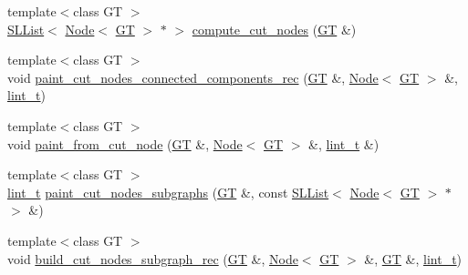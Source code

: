 \begin{DoxyCompactItemize}
\item 
{\footnotesize template$<$class GT $>$ }\\\hyperlink{class_designar_1_1_s_l_list}{S\+L\+List}$<$ \hyperlink{namespace_designar_a5af326c65aa2bd26b26c410f2030d09e}{Node}$<$ \hyperlink{demo-buildgraph_8_c_a3001c40d2c31ca87ed96cd7d1334a55e}{GT} $>$ $\ast$ $>$ \hyperlink{namespace_designar_a8e4bd28af32addb6683407d7e898de7b}{compute\+\_\+cut\+\_\+nodes} (\hyperlink{demo-buildgraph_8_c_a3001c40d2c31ca87ed96cd7d1334a55e}{GT} \&)
\item 
{\footnotesize template$<$class GT $>$ }\\void \hyperlink{namespace_designar_aba19bd6f648fd502d1dcbcc37d1edfda}{paint\+\_\+cut\+\_\+nodes\+\_\+connected\+\_\+components\+\_\+rec} (\hyperlink{demo-buildgraph_8_c_a3001c40d2c31ca87ed96cd7d1334a55e}{GT} \&, \hyperlink{namespace_designar_a5af326c65aa2bd26b26c410f2030d09e}{Node}$<$ \hyperlink{demo-buildgraph_8_c_a3001c40d2c31ca87ed96cd7d1334a55e}{GT} $>$ \&, \hyperlink{namespace_designar_a9d113d66a39e82b73727c72cd3a52f73}{lint\+\_\+t})
\item 
{\footnotesize template$<$class GT $>$ }\\void \hyperlink{namespace_designar_a0b57b399593e711bef1c99a4c41c238a}{paint\+\_\+from\+\_\+cut\+\_\+node} (\hyperlink{demo-buildgraph_8_c_a3001c40d2c31ca87ed96cd7d1334a55e}{GT} \&, \hyperlink{namespace_designar_a5af326c65aa2bd26b26c410f2030d09e}{Node}$<$ \hyperlink{demo-buildgraph_8_c_a3001c40d2c31ca87ed96cd7d1334a55e}{GT} $>$ \&, \hyperlink{namespace_designar_a9d113d66a39e82b73727c72cd3a52f73}{lint\+\_\+t} \&)
\item 
{\footnotesize template$<$class GT $>$ }\\\hyperlink{namespace_designar_a9d113d66a39e82b73727c72cd3a52f73}{lint\+\_\+t} \hyperlink{namespace_designar_a4a53202e6320a9435f829867671c26c1}{paint\+\_\+cut\+\_\+nodes\+\_\+subgraphs} (\hyperlink{demo-buildgraph_8_c_a3001c40d2c31ca87ed96cd7d1334a55e}{GT} \&, const \hyperlink{class_designar_1_1_s_l_list}{S\+L\+List}$<$ \hyperlink{namespace_designar_a5af326c65aa2bd26b26c410f2030d09e}{Node}$<$ \hyperlink{demo-buildgraph_8_c_a3001c40d2c31ca87ed96cd7d1334a55e}{GT} $>$ $\ast$$>$ \&)
\item 
{\footnotesize template$<$class GT $>$ }\\void \hyperlink{namespace_designar_aecd027238b87a5b24792ea3ccd0c44b1}{build\+\_\+cut\+\_\+nodes\+\_\+subgraph\+\_\+rec} (\hyperlink{demo-buildgraph_8_c_a3001c40d2c31ca87ed96cd7d1334a55e}{GT} \&, \hyperlink{namespace_designar_a5af326c65aa2bd26b26c410f2030d09e}{Node}$<$ \hyperlink{demo-buildgraph_8_c_a3001c40d2c31ca87ed96cd7d1334a55e}{GT} $>$ \&, \hyperlink{demo-buildgraph_8_c_a3001c40d2c31ca87ed96cd7d1334a55e}{GT} \&, \hyperlink{namespace_designar_a9d113d66a39e82b73727c72cd3a52f73}{lint\+\_\+t})
$$
\end{DoxyCompactItemize}
